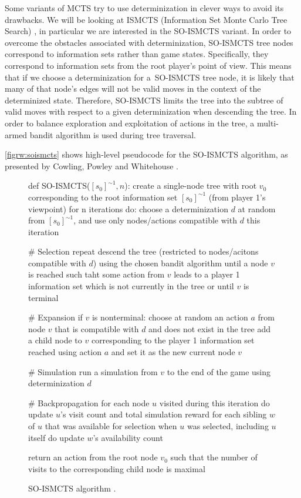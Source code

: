 Some variants of MCTS try to use determinization in clever ways to avoid its drawbacks.
We will be looking at ISMCTS (Information Set Monte Carlo Tree Search)
\cite{Cowling12}, in particular we are interested in the SO-ISMCTS variant.
In order to overcome the obstacles associated with determinization, SO-ISMCTS
tree nodes correspond to information sets rather than game states. Specifically,
they correspond to information sets from the root player's point of view. This
means that if we choose a determinization for a~SO-ISMCTS tree node, it is likely
that many of that node's edges will not be valid moves in the context
of the determinized state. Therefore, SO-ISMCTS limits the tree into the subtree
of valid moves with respect to a given determinization when descending the tree.
In order to balance exploration and exploitation of actions in the tree,
a multi-armed bandit algorithm is used during tree traversal.

\autoref{figrw:soismcts} shows high-level pseudocode for the SO-ISMCTS algorithm,
as presented by Cowling, Powley and Whitehouse \cite{Cowling12}.

\begin{figure}[ht]
\begin{code}[commandchars=\\\{\},codes={\catcode`\$=3\catcode`\^=7\catcode`\_=8}]
def SO-ISMCTS($[s_{0}]^{\sim1}, n$):
    create a single-node tree with root $v_{0}$ corresponding to the
        root information set $[s_{0}]^{\sim1}$ (from player 1's viewpoint)
    for n iterations do:
        choose a determinization $d$ at random from $[s_{0}]^{\sim1}$, and
        use only nodes/actions compatible with $d$ this iteration
        
        # Selection
        repeat
            descend the tree (restricted to nodes/acitons compatible 
            with $d$) using the chosen bandit algorithm
        until a node $v$ is reached such taht some action from $v$ leads
        to a player 1 information set which is not
        currently in the tree or until $v$ is terminal
        
        # Expansion
        if $v$ is nonterminal:
            choose at random an action $a$ from node $v$ that is
            compatible with $d$ and does not exist in the tree
            add a child node to $v$ corresponding to the player
            1 information set reached using action $a$ and set
            it as the new current node $v$

        # Simulation
        run a simulation from $v$ to the end of the game using
        determinization $d$

        # Backpropagation
        for each node $u$ visited during this iteration do
            update $u$'s visit count and total simulation reward
            for each sibling $w$ of $u$ that was available for
            selection when $u$ was selected, including $u$ itself do
                update $w$'s availability count

    return an action from the root node $v_{0}$ such that the
    number of visits to the corresponding child node is maximal
\end{code}
\caption{SO-ISMCTS algorithm \cite{Cowling12}.}\label{figrw:soismcts}
\end{figure}

